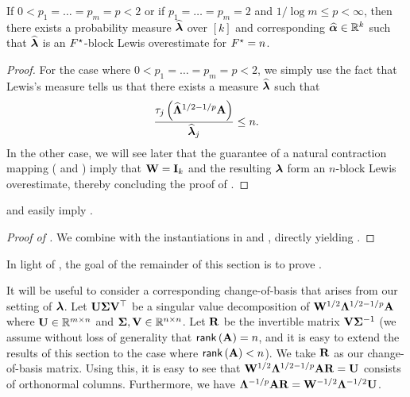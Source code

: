 \documentclass[11pt]{article}
\numberwithin{equation}{section}
\begin{document}
\begin{lemma}
\label{lemma:block_instantiation_alleq}
If $0 < p_1=\dots=p_m=p < 2$ or if $p_1=\dots=p_m=2$ and $1/\log m \le p < \infty$, then there exists a probability measure $\widehat{\bm{\lambda}}$ over $[k]$ and corresponding $\widehat{\bm{\alpha}} \in \mathbb{R}^k$ such that $\widehat{\bm{\lambda}}$ is an $F^{\star}$-block Lewis overestimate for $F^{\star}=n$.
\end{lemma}
\begin{proof}
For the case where $0 < p_1=\dots=p_m=p < 2$, we simply use the fact that Lewis's measure tells us that there exists a measure $\widehat{\bm{\lambda}}$ such that
\begin{align*}
    \frac{\tau_j\left(\widehat{\mathbf{\Lambda}}^{1/2-1/p}\mathbf{A}\right)}{\widehat{\bm{\lambda}}_j} \le n.
\end{align*}
In the other case, we will see later that the guarantee of a natural contraction mapping ( and ) imply that $\mathbf{W} = \mathbf{I}_k$ and the resulting $\bm{\lambda}$ form an $n$-block Lewis overestimate, thereby concluding the proof of .
\end{proof}

 and  easily imply .

\begin{proof}[Proof of ]
We combine  with the instantiations in  and , directly yielding .
\end{proof}

In light of , the goal of the remainder of this section is to prove . 

It will be useful to consider a corresponding change-of-basis that arises from our setting of $\bm{\lambda}$. Let $\mathbf{U}\mathbf{\Sigma}\mathbf{V}^{\top}$ be a singular value decomposition of $\mathbf{W}^{1/2}\mathbf{\Lambda}^{1/2-1/p}\mathbf{A}$ where $\mathbf{U} \in \mathbb{R}^{m \times n}$ and $\mathbf{\Sigma}, \mathbf{V} \in \mathbb{R}^{n \times n}$. Let $\mathbf{R}$ be the invertible matrix $\mathbf{V}\mathbf{\Sigma}^{-1}$ (we assume without loss of generality that $\mathsf{rank}\left(\mathbf{A}\right) = n$, and it is easy to extend the results of this section to the case where $\mathsf{rank}\left(\mathbf{A}\right) < n$). We take $\mathbf{R}$ as our change-of-basis matrix. Using this, it is easy to see that $\mathbf{W}^{1/2}\mathbf{\Lambda}^{1/2-1/p}\mathbf{A}\mathbf{R} = \mathbf{U}$ consists of orthonormal columns. Furthermore, we have $\mathbf{\Lambda}^{-1/p}\mathbf{A}\mathbf{R} = \mathbf{W}^{-1/2}\mathbf{\Lambda}^{-1/2}\mathbf{U}$.
 
\end{document}
